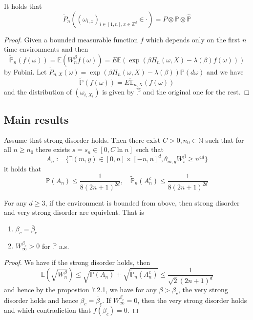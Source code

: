 \begin{lemma}
    It holds that
    \[
    \tilde{P}_n((\omega_{i,x})_{i\in[1,n],x\in\mathbb{Z}^d}\in \cdot) = P\otimes \mathbb{P}\otimes\widehat{\mathbb{P}}
    \]
\end{lemma}
\begin{proof}
    Given a bounded measurable function $f$ which depends only on the first $n$ time environments and then
    \[
    \tilde{\mathbb{P}}_n(f(\omega)) = \mathbb{E}(W_n^{\beta}f(\omega)) = E\mathbb{E}(\exp(\beta H_n(\omega,X) - \lambda(\beta)f(\omega)))
    \]
    by Fubini. Let $\tilde{P}_{n,X}(\omega) = \exp(\beta H_n(\omega,X) - \lambda(\beta))\mathbb{P}(d\omega)$ and we have
    \[
    \tilde{\mathbb{P}}(f(\omega)) = E\tilde{\mathbb{E}}_{n,X}(f(\omega))
    \]
    and the distribution of $(\omega_{i,X_i})$ is given by $\hat{\mathbb{P}}$ and the original one for the rest.
\end{proof}
\newpage
\subsection{Main results}

\begin{proposition}
    Assume that strong disorder holds. Then there exist $C>0, n_0\in\mathbb{N}$ such that for all $n\geq n_0$ there exists $s = s_n \in [0,C\ln n]$ such that
    \[
    A_n:= \{\exists (m,y)\in[0,n]\times[-n,n]^d, \theta_{m,y} W_s^{\beta} \geq n^{4d}\}
    \]
    it holds that
    \[
    \mathbb{P}(A_n) \leq \dfrac{1}{8(2n+1)^{2d}},\quad \tilde{\mathbb{P}}_n(A_n^c) \leq \dfrac{1}{8(2n+1)^{2d}}
    \]
\end{proposition}

\begin{theorem}
    For any $d\geq 3$, if the environment is bounded from above, then strong disorder and very strong disorder are equivlent. That is \begin{enumerate}
        \item $\beta_c = \bar{\beta}_c$
        \item $W_{\infty}^{\beta_c} > 0$ for $\mathbb{P}$ a.s.
    \end{enumerate}
\end{theorem}
\begin{proof}
    We have if the strong disorder holds, then
    \[
    \mathbb{E}(\sqrt{W_n^{\beta}}) \leq \sqrt{\mathbb{P}(A_n)} + \sqrt{\tilde{\mathbb{P}}_n(A_n^c)} \leq \dfrac{1}{\sqrt{2}(2n+1)^d} 
    \]
    and hence by the propostion 7.2.1, we have for any $\beta > \beta_c$, the very strong disorder holds and hence $\beta_c = \bar{\beta}_c$. If $W_{\infty}^{\beta_c} = 0$, then the very strong disorder holds and which contradiction that $f(\beta_c) = 0$.
\end{proof}

